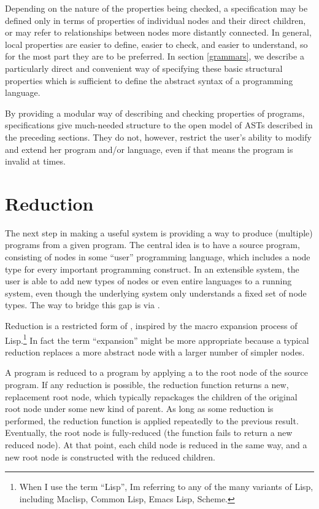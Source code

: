 Depending on the nature of the properties being checked, a specification may be defined only in terms of  properties of individual nodes and their direct children, or may refer to  relationships between nodes more distantly connected. In general, local properties are easier to define, easier to check, and easier to understand, so for the most part they are to be preferred. In section \ref{grammars}, we describe a particularly direct and convenient way of specifying these basic structural properties which is sufficient to define the abstract syntax of a programming language.

By providing a modular way of describing and checking properties of programs, specifications give much-needed structure to the open model of ASTs described in the preceding sections. They do not, however, restrict the user's ability to modify and extend her program and/or language, even if that means the program is invalid at times.


\section{Reduction}
\label{reduction}
The next step in making a useful system is providing a way to produce (multiple)  programs from a given  program. The central idea is to have a source program, consisting of nodes in some ``user'' programming language, which includes a node type for every important programming construct. In an extensible system, the user is able to add new types of nodes or even entire languages to a running system, even though the underlying system only understands a fixed set of node types. The way to bridge this gap is via .

Reduction is a restricted form of , inspired by the macro expansion process of Lisp.\footnote{When I use the term ``Lisp'', Im referring to any of the many variants of Lisp, including Maclisp, Common Lisp, Emacs Lisp, Scheme.} In fact the term ``expansion'' might be more appropriate because a typical reduction replaces a more abstract node with a larger number of simpler nodes.

A  program is reduced to a  program by applying a  to the root node of the source program. If any reduction is possible, the reduction function returns a new, replacement root node, which typically repackages the children of the original root node under some new kind of parent. As long as some reduction is performed, the reduction function is applied repeatedly to the previous result. Eventually, the root node is fully-reduced (the function fails to return a new reduced node). At that point, each child node is reduced in the same way, and a new root node is constructed with the reduced children.


